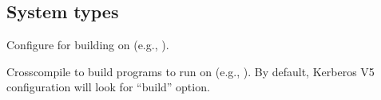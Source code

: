 \documentclass[letterpaper,10pt,english]{sphinxmanual}
\begin{document}
\subsection{System types}
\label{\detokenize{build/options2configure:system-types}}\begin{description}
\sphinxAtStartPar
Configure for building on 
(e.g., ).

\sphinxAtStartPar
Cross\sphinxhyphen{}compile to build programs to run on 
(e.g., ).  By default, Kerberos V5
configuration will look for “build” option.

\end{description}
\end{document}
